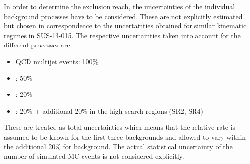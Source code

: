 In order to determine the exclusion reach, the uncertainties of the individual background processes have to be considered. These are not explicitly estimated but chosen in correspondence to the uncertainties obtained for similar kinematic regimes in SUS-13-015. The respective uncertainties taken into account for the different processes are
\begin{itemize}
 \item QCD multijet events: 100\%
 \item \ZJets: 50\%
 \item \WJets: 20\%
 \item \ttbar: 20\% + additional 20\% in the high \met search regions (SR2, SR4)
\end{itemize}  
These are treated as total uncertainties which means that the relative rate is assumed to be known for the first three backgrounds and allowed to vary within the additional 20\% for \ttbar background. The actual statistical uncertainty of the number of simulated MC events is not considered explicitly. 
\begin{table}[!t]
\centering
\caption{Total event yields obtained from simulated samples after the baseline selection described in the text (\textit{first column}) as well as event yields for the various signal regions (\textit{column two to five}). All numbers are scaled to 19.5\fbinv. The signal points are labelled as (X, Y) where X is the stop quark mass and Y is the LSP mass in GeV. Furthermore, the signal over background ratios are displayed for the two signal points in squared brackets. }
 \resizebox{\textwidth}{!}{%
\begin{tabular}{llllll}
\multicolumn{6}{c}{} \\
  \toprule
    & total & SR1 & SR2 & SR3 & SR4  \\
  \midrule
   \ttbar & 16461 & 13525 & 754 & 1868 & 314 \\
   \WJets & 12481 & 9660 & 1516 & 985 & 320 \\
   \ZJets & 11837 & 8155 & 2425 & 810 & 447 \\
   QCD multijet & 20013 & 19574 & 0 & 397 & 42 \\
   \midrule
   Signal (600, 50) & 1012 [16.6$\cdot 10^{-3}$] & 416 [8.2$\cdot 10^{-3}$] & 389 [82.8$\cdot 10^{-3}$] & 101 [24.9$\cdot 10^{-3}$] & 106 [94.6$\cdot 10^{-3}$]  \\
   Signal (1100, 50) & 29 [0.5$\cdot 10^{-3}$] & 2 [0.05$\cdot 10^{-3}$] & 8 [1.7$\cdot 10^{-3}$] & 3 [0.7$\cdot 10^{-3}$] & 16 [14.0$\cdot 10^{-3}$]  \\
  \bottomrule
\end{tabular}}
\label{tab:stop_baseline_cutflow}
\end{table}   

